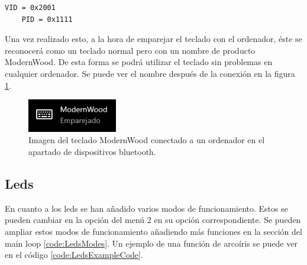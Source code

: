 \begin{lstlisting}[style=console, language=bash, caption={Números elegidos para el PID/VID}, label={code:PIDVID}]
    VID = 0x2001
    PID = 0x1111
\end{lstlisting}

Una vez realizado esto, a la hora de emparejar el teclado con el ordenador, éste se reconocerá como un teclado normal pero con un nombre de producto ModernWood. De esta forma se podrá utilizar el teclado sin problemas en cualquier ordenador. Se puede ver el nombre después de la conexión en la figura \ref{fig:ModernWoodLinked}.

\begin{figure}[H]
    \centering
    \includegraphics[width=0.35\textwidth]{imagenes/Capitulos/Cap13/ModernWoodLinked.png}
    \caption{Imagen del teclado ModernWood conectado a un ordenador en el apartado de dispositivos bluetooth.}
    \label{fig:ModernWoodLinked}
\end{figure}

\subsection{Leds}\label{ApendiceLeds}

En cuanto a los leds se han añadido varios modos de funcionamiento. Estos se pueden cambiar en la opción del menú 2 en su opción correspondiente. Se pueden ampliar estos modos de funcionamiento añadiendo más funciones en la sección del main loop \ref{code:LedsModes}. Un ejemplo de una función de arcoíris se puede ver en el código \ref{code:LedsExampleCode}.

